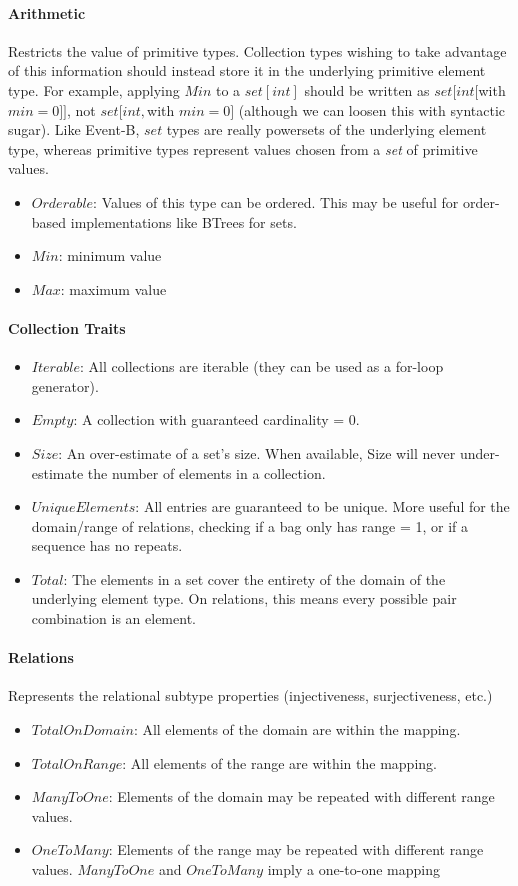 \documentclass{article}
\begin{document}
\paragraph{Arithmetic} Restricts the value of primitive types. Collection types wishing to take advantage of this information should instead store it in the underlying primitive element type. For example, applying $Min$ to a $set[int]$ should be written as $set[int[$with $min=0]]$, not $set[int, $with $min=0]$ (although we can loosen this with syntactic sugar). Like Event-B, $set$ types are really powersets of the underlying element type, whereas primitive types represent values chosen from a \textit{set} of primitive values.
\begin{itemize}
    \item $Orderable$: Values of this type can be ordered. This may be useful for order-based implementations like BTrees for sets.
    \item $Min$: minimum value
    \item $Max$: maximum value
\end{itemize}

\paragraph{Collection Traits}
\begin{itemize}
    \item $Iterable$: All collections are iterable (they can be used as a for-loop generator).
    \item $Empty$: A collection with guaranteed cardinality = 0.
    \item $Size$: An over-estimate of a set's size. When available, Size will never under-estimate the number of elements in a collection.
    \item $UniqueElements$: All entries are guaranteed to be unique. More useful for the domain/range of relations, checking if a bag only has range = 1, or if a sequence has no repeats.
    \item $Total$: The elements in a set cover the entirety of the domain of the underlying element type. On relations, this means every possible pair combination is an element.
\end{itemize}

\paragraph{Relations}
Represents the relational subtype properties (injectiveness, surjectiveness, etc.)
\begin{itemize}
    \item $TotalOnDomain$: All elements of the domain are within the mapping.
    \item $TotalOnRange$: All elements of the range are within the mapping.
    \item $ManyToOne$: Elements of the domain may be repeated with different range values.
    \item $OneToMany$: Elements of the range may be repeated with different range values. $ManyToOne$ and $OneToMany$ imply a one-to-one mapping
\end{itemize}
\end{document}
